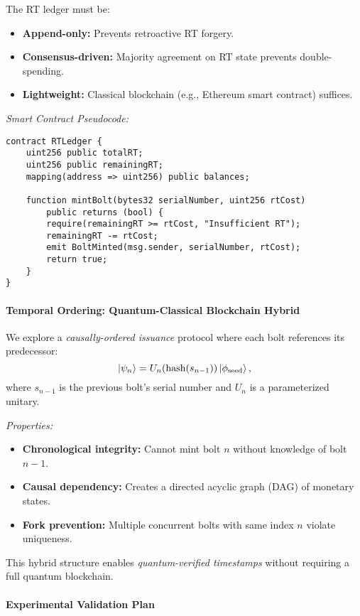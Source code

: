 \documentclass[a4paper,10.5pt,twoside]{article}
\begin{document}
The RT ledger must be:
\begin{itemize}
    \item \textbf{Append-only:} Prevents retroactive RT forgery.
    \item \textbf{Consensus-driven:} Majority agreement on RT state prevents double-spending.
    \item \textbf{Lightweight:} Classical blockchain (e.g., Ethereum smart contract) suffices.
\end{itemize}

\textit{Smart Contract Pseudocode:}
\begin{verbatim}
contract RTLedger {
    uint256 public totalRT;
    uint256 public remainingRT;
    mapping(address => uint256) public balances;
    
    function mintBolt(bytes32 serialNumber, uint256 rtCost) 
        public returns (bool) {
        require(remainingRT >= rtCost, "Insufficient RT");
        remainingRT -= rtCost;
        emit BoltMinted(msg.sender, serialNumber, rtCost);
        return true;
    }
}
\end{verbatim}

\paragraph{Temporal Ordering: Quantum-Classical Blockchain Hybrid}

We explore a \textit{causally-ordered issuance} protocol where each bolt references its predecessor:
\[
\ket{\psi_n} = U_n(\text{hash}(s_{n-1})) \ket{\phi_{\text{seed}}},
\]
where $s_{n-1}$ is the previous bolt's serial number and $U_n$ is a parameterized unitary.

\textit{Properties:}
\begin{itemize}
    \item \textbf{Chronological integrity:} Cannot mint bolt $n$ without knowledge of bolt $n-1$.
    \item \textbf{Causal dependency:} Creates a directed acyclic graph (DAG) of monetary states.
    \item \textbf{Fork prevention:} Multiple concurrent bolts with same index $n$ violate uniqueness.
\end{itemize}

This hybrid structure enables \textit{quantum-verified timestamps} without requiring a full quantum blockchain.

\paragraph{Experimental Validation Plan}
\end{document}
